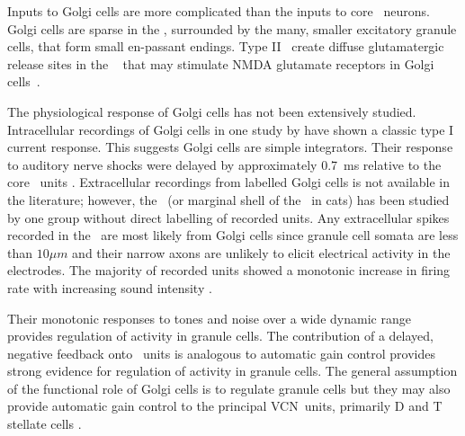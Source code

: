 


Inputs to Golgi cells are more complicated than the inputs to core \VCN~neurons.
Golgi cells are sparse in the \GCD, surrounded by the many, smaller excitatory granule cells, that form small en-passant endings.
Type II \ANFs~create diffuse glutamatergic release sites in the \GCD~\citep{HurdHutsonEtAl:1999,BensonBrown:2004} that may stimulate NMDA glutamate receptors in Golgi cells~\citep{FerragamoGoldingEtAl:1998a}.


The physiological response of Golgi cells has not been extensively studied.
Intracellular recordings of Golgi cells in one study by \citet{FerragamoGoldingEtAl:1998} have shown a classic type I current response.
This suggests Golgi cells are simple integrators.
Their response to auditory nerve shocks were delayed by approximately 0.7~ms relative to the core \VCN~units \citep{FerragamoGoldingEtAl:1998}.
Extracellular recordings from labelled Golgi cells is not available in the literature; however, the \GCD~(or marginal shell of the \VCN~in cats) has been studied by one group \citet{GhoshalKim:1997} without direct labelling of recorded units.
Any extracellular spikes recorded in the \GCD~are most likely from Golgi cells since granule cell somata are less than $10 \mu{m}$ and their narrow axons are unlikely to elicit electrical activity in the electrodes.
The majority of recorded units showed a monotonic increase in firing rate with increasing sound intensity \citep[Figure~\ref{fig:GolgiKimFig2}][]{GhoshalKim:1997}.


Their monotonic responses to tones and noise over a wide dynamic range provides regulation of activity in granule cells.
The contribution of a delayed, negative feedback onto \VCN~units is analogous to automatic gain control provides strong evidence for regulation of activity in granule cells. The general assumption of the functional role of Golgi cells is to regulate granule cells but they may also provide automatic gain control to the principal VCN~units, primarily D and T stellate cells \citep{FerragamoGoldingEtAl:1998a}.

